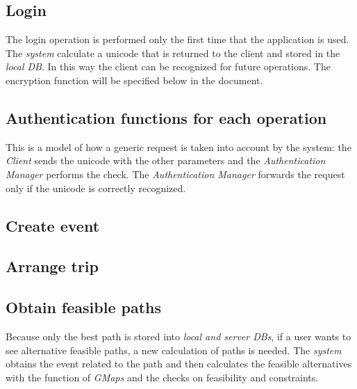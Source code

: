 \subsection{Login}
			\noindent{}
			The login operation is performed only the first time that the application is used. 
			The \textit{system} calculate a unicode that is returned to the client and stored in the \textit{local DB}. In this way the client can be recognized for future operations. 
			The encryption function will be specified below in the document.
\subsection{Authentication functions for each operation}
		\noindent{}
		This is a model of how a generic request is taken into account by the system: the \textit{Client} sends the unicode with the other parameters and the \textit{Authentication Manager} performs the check. 
		The \textit{Authentication Manager} forwards the request only if the unicode is correctly recognized.
\subsection{Create event}
		\noindent{}
\subsection{Arrange trip}
		\noindent{}
\subsection{Obtain feasible paths}
		\noindent{}
		Because only the best path is stored into \textit{local and server DBs}, if a user wants to see alternative feasible paths, a new calculation of paths is needed. 
		The \textit{system} obtains the event related to the path and then calculates the feasible alternatives with the function of \textit{GMaps} and the checks on feasibility and constraints.
